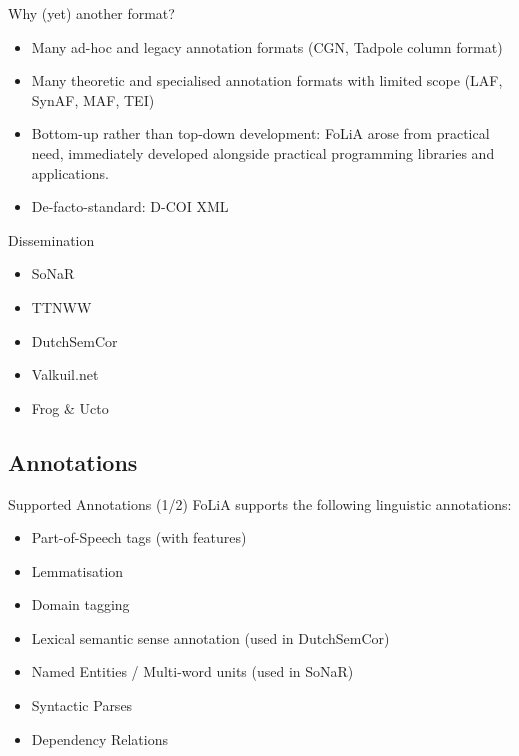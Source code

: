 \documentclass[compress,10pt]{beamer}
\begin{document}
\begin{frame}
	\begin{block}{Why (yet) another format?}
		\begin{itemize}
			\item Many ad-hoc and legacy annotation formats (CGN, Tadpole column format)
			\item Many theoretic and specialised annotation formats with limited scope (LAF, SynAF, MAF, TEI)
			\item Bottom-up rather than top-down development: FoLiA arose from practical need, immediately developed alongside practical programming libraries and applications. 
			\item De-facto-standard: D-COI XML
		\end{itemize}
	\end{block}
	
	\begin{block}{Dissemination}
		\begin{itemize}	
			\item SoNaR
			\item TTNWW
			\item DutchSemCor
			\item Valkuil.net
			\item Frog \& Ucto
		\end{itemize}			
	\end{block}

\end{frame}
   
\subsection{Annotations}   
   
\begin{frame}
    \begin{block}{Supported Annotations (1/2)}
        FoLiA supports the following linguistic annotations:
        \begin{itemize}
            \item Part-of-Speech tags (with features)
            \item Lemmatisation
            \item Domain tagging
            \item Lexical semantic sense annotation (used in DutchSemCor)
            \item Named Entities / Multi-word units (used in SoNaR)
            \item Syntactic Parses
            \item Dependency Relations            
        \end{itemize}        
    \end{block}
\end{frame}
            
\end{document}
